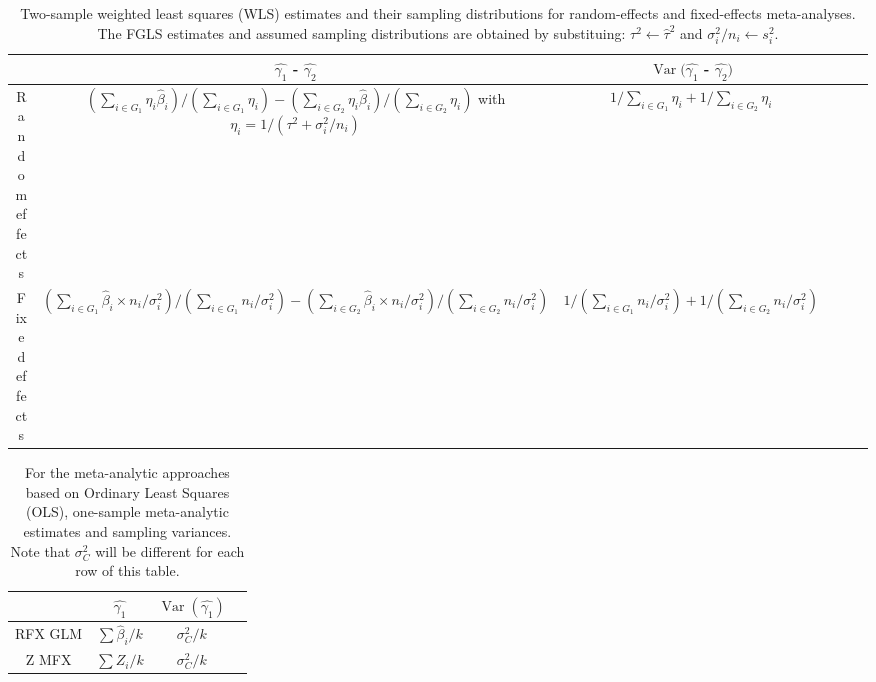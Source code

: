 \documentclass[preprint]{elsarticle}
\DeclareMathOperator{\Var}{Var}
\newcommand{\effectvector}{\hat\beta}
\newcommand{\effect}[1][i]{\effectvector_{#1}}
\newcommand{\vareffect}[1][i]{s^2_{#1}}
\newcommand{\zeffect}[1][\studyidx]{Z_{#1}}
\newcommand{\nStudies}{k}
\newcommand{\studyidx}{i}
\newcommand{\varCombined}{\sigma^2_{C}}
\newcommand{\metaanalyticeffect}[1][i]{\gamma_{#1}}
\newcommand{\varBetween}{\tau^2}
\newcommand{\estvarBetween}{\hat\tau^2}
\newcommand{\nSubjects}[1][i]{n_{#1}}
\newcommand{\varWithin}[1][i]{\sigma^2_{#1}}
\newcommand{\varWithinConInv}[1][i]{\nSubjects[#1] / \sigma^2_{#1}}
\begin{document}
\begin{table*}[h]
\begin{center}
\setlength{\tabcolsep}{3pt}
\begin{tabular}{cccccl}
				& $\hat{\metaanalyticeffect[1]}$ - $\hat{\metaanalyticeffect[2]}$ & $\Var(\hat{\metaanalyticeffect[1]}$ - $\hat{\metaanalyticeffect[2]})$\\
\hline						
Random effects 		& $ \displaystyle \left( \sum_{i \in G_1} \eta_i \effect \right) / \left( \sum_{i \in G_1} \eta_i \right) - \left( \sum_{i \in G_2} \eta_i \effect \right) / \left( \sum_{i \in G_2} \eta_i \right)$ with $\displaystyle \eta_i = 1/\left(\varBetween + \varWithin/\nSubjects\right)$ & $\displaystyle 1/\sum_{i \in G_1} \eta_i + 1/\sum_{i \in G_2} \eta_i$\\
Fixed effects 		& $ \displaystyle \left( \sum_{i \in G_1} \effect \times \varWithinConInv \right) / \left(\sum_{i \in G_1} \varWithinConInv \right) - \left( \sum_{i \in G_2} \effect \times \varWithinConInv \right) / \left(\sum_{i \in G_2} \varWithinConInv \right)$ & $\displaystyle 1/ \left( \sum_{i \in G_1} \varWithinConInv\right) + 1/ \left(\sum_{i \in G_2} \varWithinConInv \right)$\\
\hline 
\end{tabular}
\end{center}
\caption{Two-sample weighted least squares (WLS) estimates and their sampling distributions for random-effects and fixed-effects meta-analyses. The FGLS estimates and assumed sampling distributions are obtained by substituing: $\varBetween \leftarrow \estvarBetween$ and $\varWithin/\nSubjects \leftarrow \vareffect$.}
\label{table:estimates_wls_test2}
\end{table*}


\begin{table*}[h]
\begin{center}
\setlength{\tabcolsep}{3pt}
\begin{tabular}{cccl}
				& $ \hat{\metaanalyticeffect[1]} $			& $\Var(\hat{\metaanalyticeffect[1]})$\\
\hline						
RFX GLM 		& $ \sum \effect/\nStudies $ & $ \varCombined/\nStudies $ \\
Z MFX 		& $ \sum \zeffect/\nStudies $ & $ \varCombined/\nStudies $ \\
\hline 
\end{tabular}
\end{center}
\caption{For the meta-analytic approaches based on Ordinary Least Squares (OLS), one-sample meta-analytic estimates and sampling variances. Note that $\varCombined$ will be different for each row of this table.}
\label{table:estimates_test1}
\end{table*}
\end{document}
